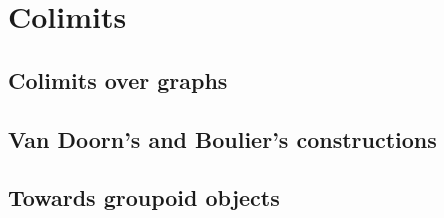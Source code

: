 \chapter{Colimits}
\label{chap:colim}

\section{Colimits over graphs}
\label{sec:colim}

\section{Van Doorn's and Boulier's constructions}
\label{sec:floris}

\section{Towards groupoid objects}
\label{sec:groupoid}